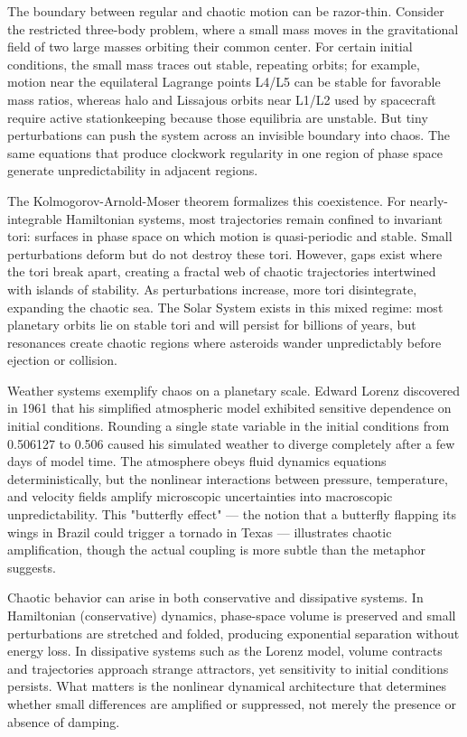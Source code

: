 The boundary between regular and chaotic motion can be razor-thin. Consider the restricted three-body problem, where a small mass moves in the gravitational field of two large masses orbiting their common center. For certain initial conditions, the small mass traces out stable, repeating orbits; for example, motion near the equilateral Lagrange points L4/L5 can be stable for favorable mass ratios, whereas halo and Lissajous orbits near L1/L2 used by spacecraft require active stationkeeping because those equilibria are unstable. But tiny perturbations can push the system across an invisible boundary into chaos. The same equations that produce clockwork regularity in one region of phase space generate unpredictability in adjacent regions.

The Kolmogorov-Arnold-Moser theorem formalizes this coexistence. For nearly-integrable Hamiltonian systems, most trajectories remain confined to invariant tori: surfaces in phase space on which motion is quasi-periodic and stable. Small perturbations deform but do not destroy these tori. However, gaps exist where the tori break apart, creating a fractal web of chaotic trajectories intertwined with islands of stability. As perturbations increase, more tori disintegrate, expanding the chaotic sea. The Solar System exists in this mixed regime: most planetary orbits lie on stable tori and will persist for billions of years, but resonances create chaotic regions where asteroids wander unpredictably before ejection or collision.

Weather systems exemplify chaos on a planetary scale. Edward Lorenz discovered in 1961 that his simplified atmospheric model exhibited sensitive dependence on initial conditions. Rounding a single state variable in the initial conditions from 0.506127 to 0.506 caused his simulated weather to diverge completely after a few days of model time. The atmosphere obeys fluid dynamics equations deterministically, but the nonlinear interactions between pressure, temperature, and velocity fields amplify microscopic uncertainties into macroscopic unpredictability. This "butterfly effect" — the notion that a butterfly flapping its wings in Brazil could trigger a tornado in Texas — illustrates chaotic amplification, though the actual coupling is more subtle than the metaphor suggests.

Chaotic behavior can arise in both conservative and dissipative systems. In Hamiltonian (conservative) dynamics, phase-space volume is preserved and small perturbations are stretched and folded, producing exponential separation without energy loss. In dissipative systems such as the Lorenz model, volume contracts and trajectories approach strange attractors, yet sensitivity to initial conditions persists. What matters is the nonlinear dynamical architecture that determines whether small differences are amplified or suppressed, not merely the presence or absence of damping.

